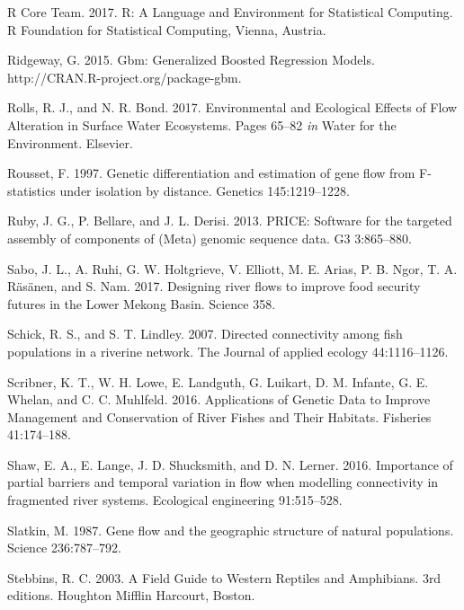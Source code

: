 \documentclass[twoside,12pt,final]{ucthesis-CA2012} %
\begin{document}
\begin{ucmainmatter}
\leavevmode\hypertarget{ref-r_core_team_r_2017}{}%
R Core Team. 2017. R: A Language and Environment for Statistical
Computing. R Foundation for Statistical Computing, Vienna, Austria.

\leavevmode\hypertarget{ref-ridgeway_gbm_2015}{}%
Ridgeway, G. 2015. Gbm: Generalized Boosted Regression Models.
http://CRAN.R-project.org/package-gbm.

\leavevmode\hypertarget{ref-rolls_environmental_2017}{}%
Rolls, R. J., and N. R. Bond. 2017. Environmental and Ecological Effects
of Flow Alteration in Surface Water Ecosystems. Pages 65--82 \emph{in}
Water for the Environment. Elsevier.

\leavevmode\hypertarget{ref-rousset_genetic_1997}{}%
Rousset, F. 1997. Genetic differentiation and estimation of gene flow
from F-statistics under isolation by distance. Genetics 145:1219--1228.

\leavevmode\hypertarget{ref-ruby_price_2013}{}%
Ruby, J. G., P. Bellare, and J. L. Derisi. 2013. PRICE: Software for the
targeted assembly of components of (Meta) genomic sequence data. G3
3:865--880.

\leavevmode\hypertarget{ref-sabo_designing_2017}{}%
Sabo, J. L., A. Ruhi, G. W. Holtgrieve, V. Elliott, M. E. Arias, P. B.
Ngor, T. A. Räsänen, and S. Nam. 2017. Designing river flows to improve
food security futures in the Lower Mekong Basin. Science 358.

\leavevmode\hypertarget{ref-schick_directed_2007}{}%
Schick, R. S., and S. T. Lindley. 2007. Directed connectivity among fish
populations in a riverine network. The Journal of applied ecology
44:1116--1126.

\leavevmode\hypertarget{ref-scribner_applications_2016}{}%
Scribner, K. T., W. H. Lowe, E. Landguth, G. Luikart, D. M. Infante, G.
E. Whelan, and C. C. Muhlfeld. 2016. Applications of Genetic Data to
Improve Management and Conservation of River Fishes and Their Habitats.
Fisheries 41:174--188.

\leavevmode\hypertarget{ref-shaw_importance_2016}{}%
Shaw, E. A., E. Lange, J. D. Shucksmith, and D. N. Lerner. 2016.
Importance of partial barriers and temporal variation in flow when
modelling connectivity in fragmented river systems. Ecological
engineering 91:515--528.

\leavevmode\hypertarget{ref-slatkin_gene_1987}{}%
Slatkin, M. 1987. Gene flow and the geographic structure of natural
populations. Science 236:787--792.

\leavevmode\hypertarget{ref-stebbins_field_2003}{}%
Stebbins, R. C. 2003. A Field Guide to Western Reptiles and Amphibians.
3rd editions. Houghton Mifflin Harcourt, Boston.


\end{ucmainmatter}
\end{document}
